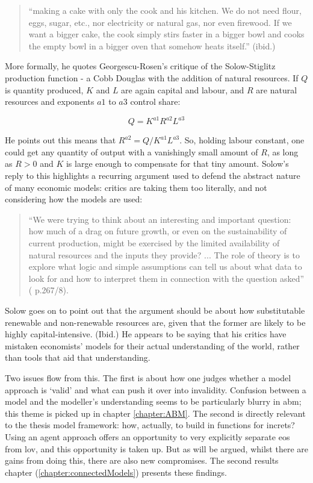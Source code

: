 \begin{quote}
``making a cake with only the cook and his kitchen. We do not need flour, eggs, sugar, etc., nor electricity or natural gas, nor even firewood. If we want a bigger cake, the cook simply stirs faster in a bigger bowl and cooks the empty bowl in a bigger oven that somehow heats itself.'' (ibid.)
\end{quote}

More formally, he quotes Georgescu-Rosen's critique of the Solow-Stiglitz production function - a Cobb Douglas with the addition of natural resources. If $Q$ is quantity produced, $K$ and $L$ are again capital and labour, and $R$ are natural resources and exponents $a1$ to $a3$ control share:

\begin{equation}
Q=K^{a1}R^{a2}L^{a\text{3}}\label{eq:}
\end{equation}

He points out this means that $R^{a2}=Q/K^{a1}L^{a3}$. So, holding labour constant, one could get any quantity of output with a vanishingly small amount of $R$, as long as $R>0$ and $K$ is large enough to compensate for that tiny amount.  Solow's reply to this highlights a recurring argument used to defend the abstract nature of many economic models: critics are taking them too literally, and not considering how the models are used:

\begin{quote}
``We were trying to think about an interesting and important question: how much of a drag on future growth, or even on the sustainability of current production, might be exercised by the limited availability of natural resources and the inputs they provide? ... The role of theory is to explore what logic and simple assumptions can tell us about what data to look for and how to interpret them in connection with the question asked'' (\citealt{solow_georgescu-roegen_1997} p.267/8).
\end{quote}

Solow goes on to point out that the argument should be about how substitutable renewable and non-renewable resources are, given that the former are likely to be highly capital-intensive. (Ibid.) He appears to be saying that his critics have mistaken economists' models for their actual understanding of the world, rather than tools that aid that understanding.

Two issues flow from this. The first is about how one judges whether a model approach is `valid' and what can push it over into invalidity. Confusion between a model and the modeller's understanding seems to be particularly blurry in \gls{abm}; this theme is picked up in chapter \ref{chapter:ABM}. The second is directly relevant to the thesis model framework: how, actually, to build in functions for \gls{increts}? Using an agent approach offers an opportunity to very explicitly separate \gls{eos} from \gls{lov}, and this opportunity is taken up. But as will be argued, whilst there are gains from doing this, there are also new compromises. The second results chapter (\ref{chapter:connectedModels}) presents these findings.

